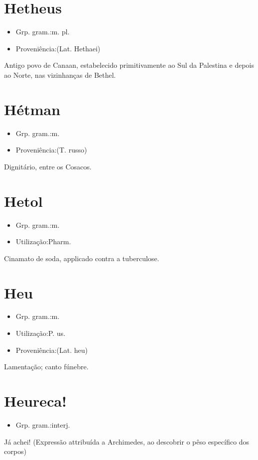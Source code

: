 \documentclass{article}
\begin{document}
\section{Hetheus}
\begin{itemize}
\item {Grp. gram.:m. pl.}
\end{itemize}
\begin{itemize}
\item {Proveniência:(Lat. \textunderscore Hethaei\textunderscore )}
\end{itemize}
Antigo povo de Canaan, estabelecido primitivamente ao Sul da Palestina e depois ao Norte, nas vizinhanças de Bethel.
\section{Hétman}
\begin{itemize}
\item {Grp. gram.:m.}
\end{itemize}
\begin{itemize}
\item {Proveniência:(T. russo)}
\end{itemize}
Dignitário, entre os Cosacos.
\section{Hetol}
\begin{itemize}
\item {Grp. gram.:m.}
\end{itemize}
\begin{itemize}
\item {Utilização:Pharm.}
\end{itemize}
Cinamato de soda, applicado contra a tuberculose.
\section{Heu}
\begin{itemize}
\item {Grp. gram.:m.}
\end{itemize}
\begin{itemize}
\item {Utilização:P. us.}
\end{itemize}
\begin{itemize}
\item {Proveniência:(Lat. \textunderscore heu\textunderscore )}
\end{itemize}
Lamentação; canto fúnebre.
\section{Heureca!}
\begin{itemize}
\item {Grp. gram.:interj.}
\end{itemize}
Já achei!
(Expressão attribuída a Archimedes, ao descobrir o pêso específico dos corpos)
\end{document}
